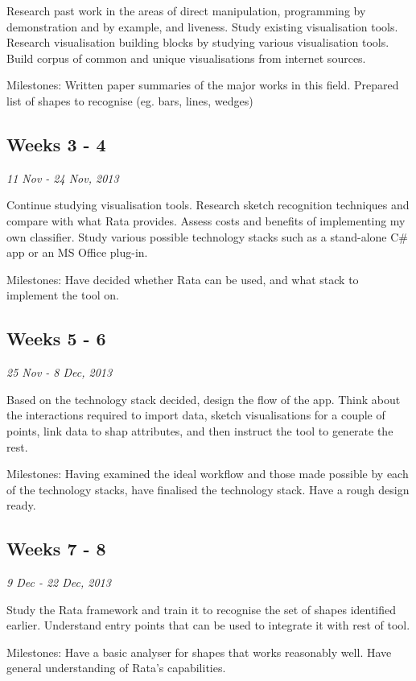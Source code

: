 Research past work in the areas of direct manipulation, programming by demonstration and by example, and liveness. Study existing visualisation tools. 
Research visualisation building blocks by studying various visualisation tools. Build corpus of common and unique visualisations from internet sources.

Milestones: Written paper summaries of the major works in this field. Prepared list of shapes to recognise (eg. bars, lines, wedges)


\subsection*{Weeks 3 - 4}
\emph{11 Nov - 24 Nov, 2013}


Continue studying visualisation tools. Research sketch recognition techniques and compare with what Rata provides. Assess costs and benefits of implementing my own classifier. Study various possible technology stacks such as a stand-alone C\# app or an MS Office plug-in.

Milestones: Have decided whether Rata can be used, and what stack to implement the tool on.


\subsection*{Weeks 5 - 6}
\emph{25 Nov - 8 Dec, 2013}

Based on the technology stack decided, design the flow of the app. Think about the interactions required to import data, sketch visualisations for a couple of points, link data to shap attributes, and then instruct the tool to generate the rest. 

Milestones: Having examined the ideal workflow and those made possible by each of the technology stacks, have finalised the technology stack. Have a rough design ready.


\subsection*{Weeks 7 - 8}
\emph{9 Dec - 22 Dec, 2013}

Study the Rata framework and train it to recognise the set of shapes identified earlier. Understand entry points that can be used to integrate it with rest of tool.

Milestones: Have a basic analyser for shapes that works reasonably well. Have general understanding of Rata's capabilities.




